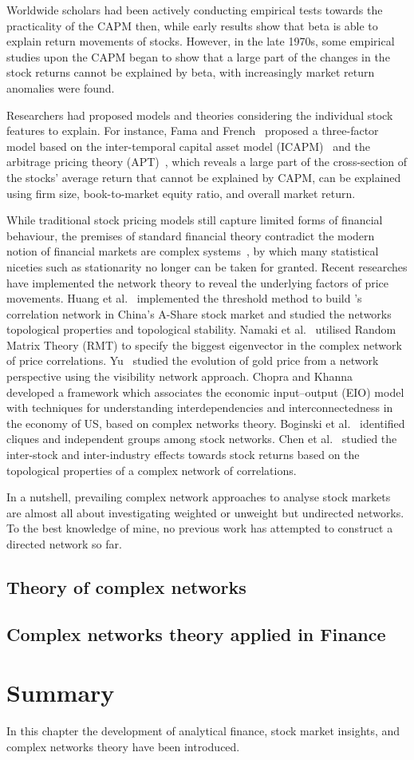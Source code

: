 Worldwide scholars had been actively conducting empirical tests towards the practicality of the CAPM then, while early results show that beta is able to explain return movements of stocks. However, in the late 1970s, some empirical studies upon the CAPM began to show that a large part of the changes in the stock returns cannot be explained by beta, with increasingly market return anomalies were found.

Researchers had proposed models and theories considering the individual stock features to explain. For instance, Fama and French~\cite{riskfactors, anomalies} proposed a three-factor model based on the inter-temporal capital asset model (ICAPM)~\cite{intertemporal} and the arbitrage pricing theory (APT)~\cite{options}, which reveals a large part of the cross-section of the stocks’ average return that cannot be explained by CAPM, can be explained using firm size, book-to-market equity ratio, and overall market return.

While traditional stock pricing models still capture limited forms of financial behaviour, the premises of standard financial theory contradict the modern notion of financial markets are complex systems~\cite{financialcomplex}, by which many statistical niceties such as stationarity no longer can be taken for granted. Recent researches have implemented the network theory to reveal the underlying factors of price movements. Huang et al.~\cite{chinesenetwork} implemented the threshold method to build ’s correlation network in China's A-Share stock market and studied the networks topological properties and topological stability. Namaki et al.~\cite{genuine} utilised Random Matrix Theory (RMT) to specify the biggest eigenvector in the complex network of price correlations. Yu~\cite{visibility} studied the evolution of gold price from a network perspective using the visibility network approach. Chopra and Khanna~\cite{intercd} developed a framework which associates the economic input–output (EIO) model with techniques for understanding interdependencies and interconnectedness in the economy of US, based on complex networks theory. Boginski et al.~\cite{statisticalanalysis} identified cliques and independent groups among stock networks. Chen et al.~\cite{CHEN2015224} studied the inter-stock and inter-industry effects towards stock returns based on the topological properties of a complex network of correlations.

In a nutshell, prevailing complex network approaches to analyse stock markets are almost all about investigating weighted or unweight but undirected networks. To the best knowledge of mine, no previous work has attempted to construct a directed network so far.

\subsection{Theory of complex networks}

\subsection{Complex networks theory applied in Finance}


\section{Summary}
In this chapter the development of analytical finance, stock market insights, and complex networks theory have been introduced.
